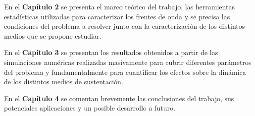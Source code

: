En el \textbf{Capítulo 2} se presenta el marco teórico del trabajo, las herramientas estadísticas utilizadas para caracterizar los frentes de onda y se precisa las 
condiciones del problema a resolver junto con la caracterización de los distintos medios que se propone estudiar.

En el \textbf{Capítulo 3} se presentan los resultados obtenidos a partir de las simulaciones numéricas realizadas masivamente para cubrir diferentes parámetros del 
problema y fundamentalmente para cuantificar los efectos sobre la dinámica de los distintos medios de sustentación.

En el \textbf{Capítulo 4} se comentan brevemente las conclusiones del trabajo, sus potenciales aplicaciones y un posible desarrollo a futuro.





